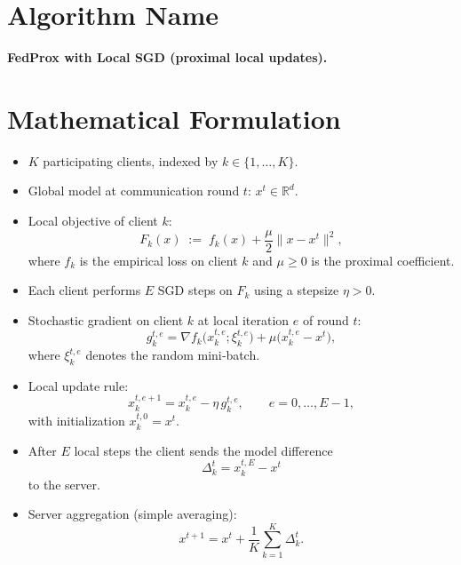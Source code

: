 \documentclass[11pt]{article}
\newcommand{\R}{\mathbb{R}}
\begin{document}
\section*{Algorithm Name}
\textbf{FedProx with Local SGD (proximal local updates).}

\section*{Mathematical Formulation}
\begin{itemize}
    \item $K$ participating clients, indexed by $k\in\{1,\dots,K\}$.
    \item Global model at communication round $t$: $x^{t}\in\R^{d}$.
    \item Local objective of client $k$:
    \[
        F_k(x)\;:=\;f_k(x)+\frac{\mu}{2}\|x-x^{t}\|^{2},
    \]
    where $f_k$ is the empirical loss on client $k$ and $\mu\ge 0$ is the proximal coefficient.
    \item Each client performs $E$ SGD steps on $F_k$ using a stepsize $\eta>0$.
    \item Stochastic gradient on client $k$ at local iteration $e$ of round $t$:
    \[
        g_{k}^{t,e}= \nabla f_k\!\bigl(x_{k}^{t,e};\xi_{k}^{t,e}\bigr)+\mu\bigl(x_{k}^{t,e}-x^{t}\bigr),
    \]
    where $\xi_{k}^{t,e}$ denotes the random mini‑batch.
    \item Local update rule:
    \[
        x_{k}^{t,e+1}=x_{k}^{t,e}-\eta\,g_{k}^{t,e},
        \qquad e=0,\dots,E-1,
    \]
    with initialization $x_{k}^{t,0}=x^{t}$.
    \item After $E$ local steps the client sends the model difference
    \[
        \Delta_{k}^{t}=x_{k}^{t,E}-x^{t}
    \]
    to the server.
    \item Server aggregation (simple averaging):
    \[
        x^{t+1}=x^{t}+\frac{1}{K}\sum_{k=1}^{K}\Delta_{k}^{t}.
    \]
\end{itemize}
\end{document}
